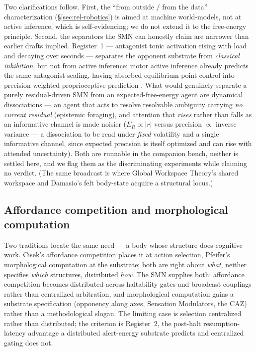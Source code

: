\documentclass{article}
\begin{document}
Two clarifications follow.  First, the ``from outside / from the data''
characterization (\S\ref{sec:rel-robotics}) is aimed at machine
world-models, not at active inference, which is self-evidencing; we do not
extend it to the free-energy principle.  Second, the separators the SMN
can honestly claim are narrower than earlier drafts implied.  Register~1
--- antagonist tonic activation rising with load and decaying over seconds
--- separates the opponent substrate from \emph{classical inhibition}, but
not from active inference: motor active inference already predicts the
same antagonist scaling, having absorbed equilibrium-point control into
precision-weighted proprioceptive prediction
\citep{AdamsShippFriston2013_ActiveInference}.  What would genuinely separate a
purely residual-driven SMN from an expected-free-energy agent are
dynamical dissociations --- an agent that acts to resolve resolvable
ambiguity carrying \emph{no current residual} (epistemic foraging), and
attention that \emph{rises} rather than falls as an informative channel is
made noisier ($E_R\!\propto\!|r|$ versus precision $\propto$ inverse
variance --- a dissociation to be read under \emph{fixed} volatility and a single
informative channel, since expected precision is itself optimized and can rise
with attended uncertainty).  Both are runnable in the companion bench, neither is
settled here, and we flag them as the discriminating experiments while claiming no
verdict.  (The same broadcast is where Global Workspace Theory's shared
workspace \citep{Baars1988CognitiveTheory} and Damasio's felt body-state
\citep{Damasio2010_Self} acquire a structural locus.)

\subsection{Affordance competition and morphological
computation}\label{sec:rel-afford}

Two traditions locate the same need --- a body whose structure does
cognitive work.  Cisek's affordance competition
\citep{Cisek2007AffordanceCompetition} places it at action selection,
Pfeifer's morphological computation
\citep{PfeiferBongard2007BodyShapesMind} at the substrate; both are right
about \emph{what}, neither specifies \emph{which} structures, distributed
\emph{how}.  The SMN supplies both: affordance competition becomes
distributed across haltability gates and broadcast couplings rather than
centralized arbitration, and morphological computation gains a substrate
specification (opponency along axes, Sensation Modulators, the CAZ)
rather than a methodological slogan.  The limiting case is selection
centralized rather than distributed; the criterion is Register~2, the
post-halt resumption-latency advantage a distributed alert-energy
substrate predicts and centralized gating does not.
\end{document}
